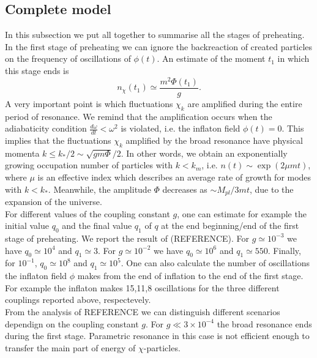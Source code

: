 \documentclass[11pt,a4paper,twoside]{book}
\begin{document}
\subsection{Complete model}
In this subsection we put all together to summarise all the stages of preheating.\\
In the first stage of preheating we can ignore the backreaction of created particles on the frequency of oscillations of $ \phi(t) $. An estimate of the moment $ t_{1} $ in which this stage ends is 
\begin{equation}
\label{Chap4:estimate}
n_{\chi}(t_{1}) \simeq \frac{m^{2}\Phi(t_{1})}{g}.
\end{equation}
A very important point is which fluctuations $\chi_{k}$ are amplified during the entire period of resonance. We remind that the amplification occurs when the adiabaticity condition $ \frac{d\omega}{dt} < \omega^{2} $ is violated, i.e. the inflaton field $ \phi(t)=0 $. This implies that the  fluctuations $\chi_{k}$ amplified by the broad resonance have physical momenta $ k \le k_{*}/2 \sim  \sqrt{gm\Phi}/2 $. In other words, we  obtain an exponentially growing occupation number of particles with $ k < k_{m} $, i.e. $ n(t) \sim \exp(2\mu m t) $, where $\mu$ is an effective index which describes an average rate of growth for modes with $ k<k_{*} $. Meanwhile, the amplitude $\Phi$ decreases as $\sim M_{pl}/3mt$, due to the expansion of the universe.\\
 For different values of the coupling constant $ g $, one can estimate for example the initial value $ q_{0} $ and the final value $ q_{1} $ of $ q $ at the end beginning/end of the first stage of preheating. We report the result of (REFERENCE). For $ g \simeq 10^{-3}$ we have $q_{0}\simeq 10^{4} $ and $ q_{1}\simeq 3 $. For $ g \simeq 10^{-2} $ we have $q_{0} \simeq 10^{6} $ and $ q_{1}\simeq 550 $. Finally, for $ 10^{-1} $, $ q_{0}\simeq 10^{8} $ and $ q_{1} \simeq 10^{5} $. One can also calculate the number of oscillations the inflaton field $ \phi $ makes from the end of inflation to the end of the first stage. For example the inflaton makes 15,11,8 oscillations for the three different couplings reported above, respectevely.\\
 From the analysis of REFERENCE we can distinguish different scenarios dependign on the coupling constant $ g $. For $ g \ll 3 \times 10^{-4} $ the broad resonance ends during the first stage. Parametric resonance in this case is not efficient enough to transfer the main part of energy of $\chi$-particles. \\
\end{document}
